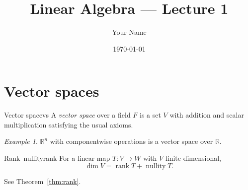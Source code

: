 \documentclass[11pt]{article}
\title{Linear Algebra --- Lecture 1}
\author{Your Name}
\date{\today}
\theoremstyle{remark}
\newtheorem*{example}{Example}
\begin{document}
\maketitle
\tableofcontents

\section{Vector spaces}

\begin{definition}{Vector space}{vs}
A \emph{vector space} over a field $F$ is a set $V$ with addition and scalar multiplication satisfying the usual axioms.
\end{definition}

\begin{example}
$\mathbb{R}^n$ with componentwise operations is a vector space over $\mathbb{R}$.
\end{example}

\begin{theorem}{Rank--nullity}{rank}
For a linear map $T \colon V \to W$ with $V$ finite-dimensional,
\[
  \dim V = \operatorname{rank} T + \operatorname{nullity} T.
\]
\end{theorem}

See Theorem~\ref{thm:rank}.
\end{document}
